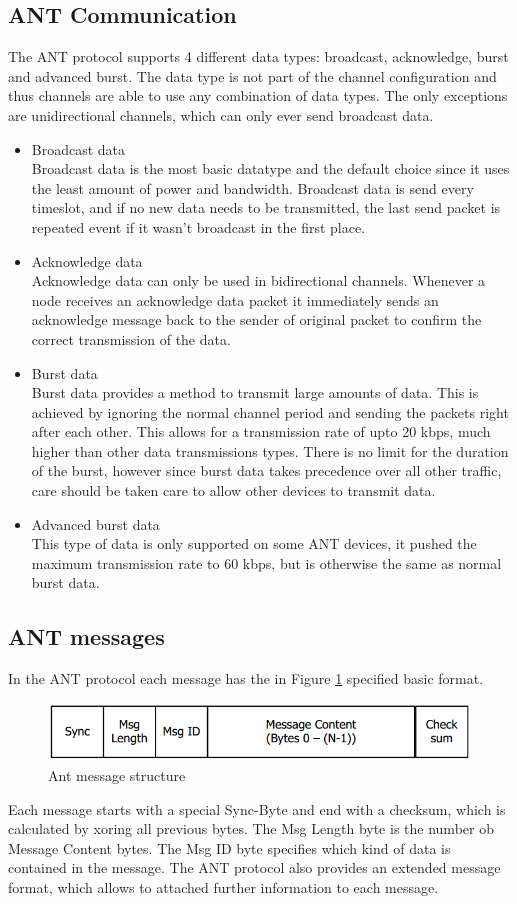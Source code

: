 \subsection{ANT Communication}
The ANT protocol supports 4 different data types: broadcast, acknowledge, burst and advanced burst. The data type is not part of the channel configuration and thus channels are able to use any combination of data types. The only exceptions are unidirectional channels, which can only ever send broadcast data.
\begin{itemize}
	\item{Broadcast data} \hfill \\ Broadcast data is the most basic datatype and the default choice since it uses the least amount of power and bandwidth. Broadcast data is send every timeslot, and if no new data needs to be transmitted, the last send packet is repeated event if it wasn't broadcast in the first place.
	\item{Acknowledge data} \hfill \\ Acknowledge data can only be used in bidirectional channels. Whenever a node receives an acknowledge data packet it immediately sends an acknowledge message back to the sender of original packet to confirm the correct transmission of the data.  
	\item{Burst data} \hfill \\ Burst data provides a method to transmit large amounts of data. This is achieved by ignoring the normal channel period and sending the packets right after each other. This allows for a transmission rate of upto 20 kbps, much higher than other data transmissions types. There is no limit for the duration of the burst, however since burst data takes precedence over all other traffic, care should be taken care to allow other devices to transmit data.
	\item{Advanced burst data} \hfill \\ This type of data is only supported on some ANT devices, it pushed the maximum transmission rate to 60 kbps, but is otherwise the same as normal burst data.
\end{itemize}

\subsection{ANT messages}
In the ANT protocol each message has the in Figure \ref{fig:antmsg} specified basic format.
\begin{figure}[h]
	\centering
	\includegraphics[scale=.75]{./pics/ANTmsg.png}
	\caption{Ant message structure}\label{fig:antmsg}
\end{figure}
Each message starts with a special Sync-Byte and end with a checksum, which is calculated by xoring all previous bytes. The Msg Length byte is the number ob Message Content bytes. The Msg ID byte specifies which kind of data is contained in the message. The ANT protocol also provides an extended message format, which allows to attached further information to each message.


